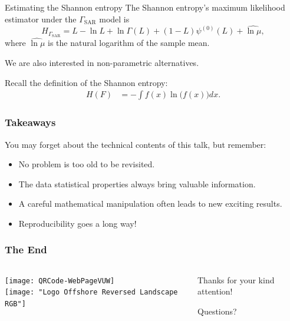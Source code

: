 \documentclass[table,aspectratio=169]{beamer}
\begin{document}
\begin{frame}{Estimating the Shannon entropy}
The Shannon entropy's maximum likelihood estimator under the $\Gamma_{\text{SAR}}$ model is
$$
\widehat{H_{\Gamma_{\text{SAR}}}} = L -\ln L+\ln\Gamma(L)+(1-L)\psi^{(0)}(L) + \widehat{\ln \mu},
$$
where $\widehat{\ln \mu}$ is the natural logarithm of the sample mean.

We are also interested in non-parametric alternatives.

Recall the definition of the Shannon entropy:
\begin{align*}
	H(F) &= -\int f(x) \ln\big(f(x)\big) dx.
\end{align*}
\end{frame}

\begin{frame}[standout]
\frametitle{Takeaways}
You may forget about the technical contents of this talk, but remember:
\begin{itemize}[<+->]
	\item No problem is too old to be revisited.
	\item The data statistical properties always bring valuable information.
	\item A careful mathematical manipulation often leads to new exciting results.
	\item Reproducibility goes a long way!
\end{itemize}
\end{frame}


\begin{frame}

 	
\end{frame}

\begin{frame}[standout]
\frametitle{The End}
\begin{columns}
	\begin{column}{.4\linewidth}
		\centering
		\texttt{[image: QRCode-WebPageVUW]}\\	\texttt{[image: "Logo Offshore Reversed Landscape RGB"]}
	\end{column}
	\begin{column}{.6\linewidth}
		Thanks for your kind attention!
		
		Questions?
	\end{column}
\end{columns}
\end{frame}
\end{document}

